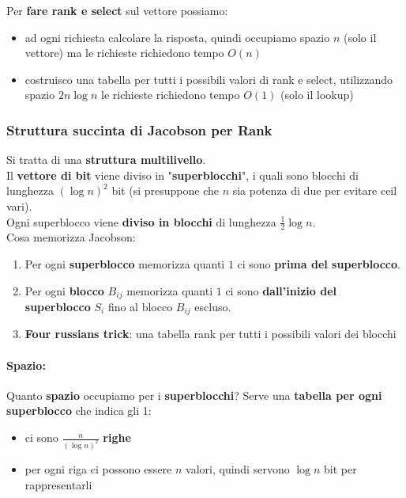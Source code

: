 Per \textbf{fare rank e select} sul vettore possiamo: 
\begin{itemize}
	\item ad ogni richiesta calcolare la risposta, quindi occupiamo spazio $n$ (solo il vettore) ma le richieste richiedono tempo $O(n)$
	\item costruisco una tabella per tutti i possibili valori di rank e select, utilizzando spazio $2n \log n$ le richieste richiedono tempo $O(1)$ (solo il lookup)
\end{itemize}
 
\newpage

\subsubsection{Struttura succinta di Jacobson per Rank}

Si tratta di una \textbf{struttura multilivello}. \\

Il \textbf{vettore di bit} viene diviso in "\textbf{superblocchi}", i quali sono blocchi di lunghezza $(\log n)^2$ bit (si presuppone che $n$ sia potenza di due per evitare ceil vari).\\

Ogni superblocco viene \textbf{diviso in blocchi} di lunghezza $\frac{1}{2} \log n$.\\

Cosa memorizza Jacobson: 
\begin{enumerate}
	\item Per ogni \textbf{superblocco} memorizza quanti $1$ ci sono \textbf{prima del superblocco}.\\
	
	\item Per ogni \textbf{blocco} $B_{ij}$ memorizza quanti $1$ ci sono \textbf{dall'inizio del superblocco} $S_i$ fino al blocco $B_{ij}$ escluso.\\
	
	\item \textbf{Four russians trick}: una tabella rank per tutti i possibili valori dei blocchi
\end{enumerate}

\paragraph{Spazio:} Quanto \textbf{spazio} occupiamo per i \textbf{superblocchi}? Serve una \textbf{tabella per ogni superblocco} che indica gli 1:
\begin{itemize}
	\item ci sono $\frac{n}{(\log n)^2}$ \textbf{righe}
	\item per ogni riga ci possono essere $n$ valori, quindi servono $\log n$ bit per rappresentarli
\end{itemize}


